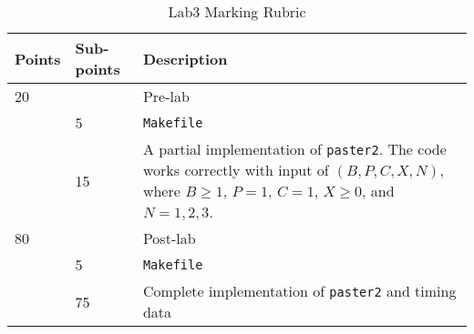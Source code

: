 \begin{table}[ht]
\begin{center}
\begin{tabular}{|p{2cm}|p{2cm}|p{9cm}|}
\hline
Points & Sub-points &Description  \\ \hline
20     &    & Pre-lab      \\ \hline
       & 5  & \verb+Makefile+\\ \hline
       & 15 & A partial implementation of \verb+paster2+. The code works correctly with input of $(B, P, C, X, N)$, where $B \ge 1$, $P = 1$, $C = 1$, $X \ge 0$, and $N = 1, 2, 3$. \\ \hline
80     &       & Post-lab \\ \hline
       & 5     & \verb+Makefile+ \\ \hline
       & 75    & Complete implementation of \verb+paster2+ and timing data\\ \hline
\end{tabular}
\caption{Lab3 Marking Rubric}
\label{tb_lab3_ipc_rubric}
\end{center}
\end{table}



